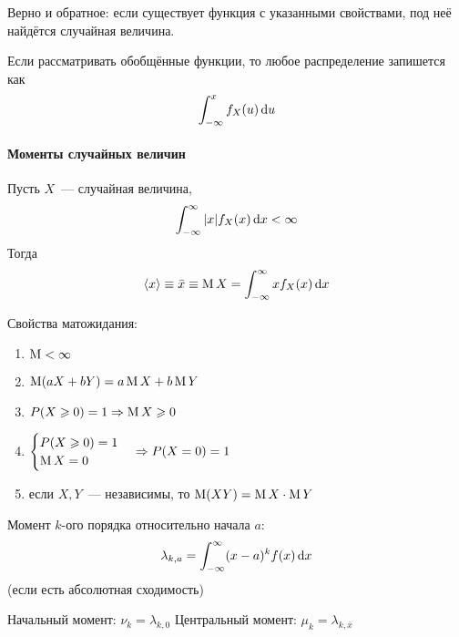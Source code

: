 \documentclass[12pt,timbord]{../../../notes}
\begin{document}
\begin{prop}\label{prop:prob::randscal::inv}
  Верно и обратное: если существует функция с  указанными свойствами, под неё найдётся случайная
  величина. 
\end{prop}

\begin{rem*}\label{rem*:prob::randscal::delta}
  Если рассматривать обобщённые функции, то любое распределение запишется как
  \[
    \int_{-\infty}^x f_X(u)\,\mathrm{d} u
  \]
\end{rem*}
\paragraph{Моменты случайных величин}
\label{par:prob::moments}

\begin{defn}\label{defn:prob::moments::exp}
  Пусть $X$~--- случайная величина, \[
    \int_{-\infty}^{\infty} |x| f_X(x)\, \mathrm{d} x < \infty 
  \]
  Тогда 
  \[
    \langle x \rangle \equiv \bar x \equiv \operatorname{\mathrm M} X = \int_{-\infty}^{\infty} x f_X(x)\, \mathrm{d} x
  \]
\end{defn}

\begin{prop}\label{prop:prob::moments::expprop}
  Свойства матожидания:
  \begin{enumerate}
    \item $\operatorname{\mathrm M} < \infty$
    \item $\operatorname{\mathrm M}(a X + b Y) = a\operatorname{\mathrm M} X + b\operatorname{\mathrm M} Y$
    \item $P(X \geqslant 0) = 1 \Rightarrow \operatorname{\mathrm M} X \geqslant 0 $
    \item $\begin{cases}
      P(X \geqslant 0) = 1 \\
      \operatorname{\mathrm M} X = 0
    \end{cases}\Rightarrow P(X= 0) =1  $
    \item если $X,Y$~--- независимы, то $\operatorname{\mathrm M} (XY) = \operatorname{\mathrm M} X \cdot \operatorname{\mathrm M} Y$
  \end{enumerate}
\end{prop}

\begin{defn}\label{prop:prob::moments::mom}
  Момент $k$-ого порядка относительно начала $a$:
  \[
    \lambda_{k,a} = \int_{-\infty}^{\infty} (x-a)^k f(x)\, \mathrm{d} x
  \]
  (если есть абсолютная сходимость)
\end{defn}
{\label{defn:prob::moments::zer} Начальный  момент: {$\nu_k =\lambda_{k,0}$}}
{\label{defn:prob::moments::cen} Центральный  момент: {$\mu_k =\lambda_{k,\bar x}$}}
\end{document}
